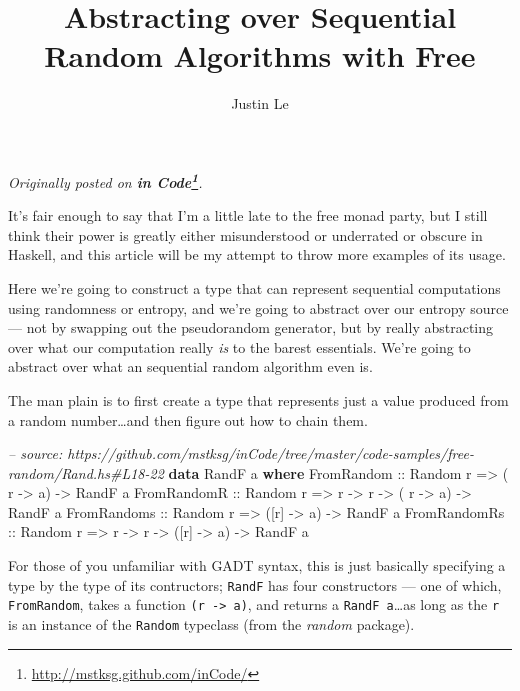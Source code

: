 \documentclass[]{article}
\title{Abstracting over Sequential Random Algorithms with Free}
\author{Justin Le}
\newenvironment{Shaded}{}{}
\newcommand{\KeywordTok}[1]{\textcolor[rgb]{0.00,0.44,0.13}{\textbf{{#1}}}}
\newcommand{\DataTypeTok}[1]{\textcolor[rgb]{0.56,0.13,0.00}{{#1}}}
\newcommand{\CommentTok}[1]{\textcolor[rgb]{0.38,0.63,0.69}{\textit{{#1}}}}
\newcommand{\OtherTok}[1]{\textcolor[rgb]{0.00,0.44,0.13}{{#1}}}
\newcommand{\NormalTok}[1]{{#1}}
\renewcommand{\href}[2]{#2\footnote{\url{#1}}}
\begin{document}
\maketitle

\emph{Originally posted on
\textbf{\href{http://mstksg.github.com/inCode/}{in Code}}.}

It's fair enough to say that I'm a little late to the free monad party,
but I still think their power is greatly either misunderstood or
underrated or obscure in Haskell, and this article will be my attempt to
throw more examples of its usage.

Here we're going to construct a type that can represent sequential
computations using randomness or entropy, and we're going to abstract
over our entropy source --- not by swapping out the pseudorandom
generator, but by really abstracting over what our computation really
\emph{is} to the barest essentials. We're going to abstract over what an
sequential random algorithm even is.

The man plain is to first create a type that represents just a value
produced from a random number\ldots{}and then figure out how to chain
them.

\begin{Shaded}
\begin{Highlighting}[]
\CommentTok{-- source: https://github.com/mstksg/inCode/tree/master/code-samples/free-random/Rand.hs#L18-22}
\KeywordTok{data} \DataTypeTok{RandF} \NormalTok{a }\KeywordTok{where}
    \DataTypeTok{FromRandom}\OtherTok{   ::} \DataTypeTok{Random} \NormalTok{r }\OtherTok{=>}           \NormalTok{( r  }\OtherTok{->} \NormalTok{a) }\OtherTok{->} \DataTypeTok{RandF} \NormalTok{a}
    \DataTypeTok{FromRandomR}\OtherTok{  ::} \DataTypeTok{Random} \NormalTok{r }\OtherTok{=>} \NormalTok{r }\OtherTok{->} \NormalTok{r }\OtherTok{->} \NormalTok{( r  }\OtherTok{->} \NormalTok{a) }\OtherTok{->} \DataTypeTok{RandF} \NormalTok{a}
    \DataTypeTok{FromRandoms}\OtherTok{  ::} \DataTypeTok{Random} \NormalTok{r }\OtherTok{=>}           \NormalTok{([r] }\OtherTok{->} \NormalTok{a) }\OtherTok{->} \DataTypeTok{RandF} \NormalTok{a}
    \DataTypeTok{FromRandomRs}\OtherTok{ ::} \DataTypeTok{Random} \NormalTok{r }\OtherTok{=>} \NormalTok{r }\OtherTok{->} \NormalTok{r }\OtherTok{->} \NormalTok{([r] }\OtherTok{->} \NormalTok{a) }\OtherTok{->} \DataTypeTok{RandF} \NormalTok{a}
\end{Highlighting}
\end{Shaded}

For those of you unfamiliar with GADT syntax, this is just basically
specifying a type by the type of its contructors; \texttt{RandF} has
four constructors --- one of which, \texttt{FromRandom}, takes a
function \texttt{(r\ -\textgreater{}\ a)}, and returns a
\texttt{RandF\ a}\ldots{}as long as the \texttt{r} is an instance of the
\texttt{Random} typeclass (from the \emph{random} package).
\end{document}
